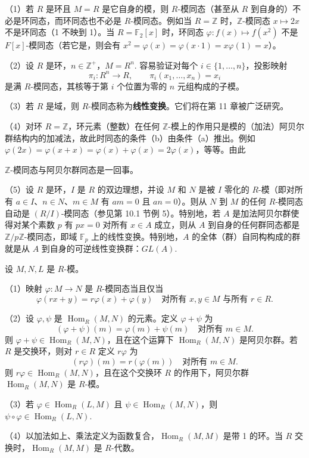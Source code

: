 \begin{example}
（1）若 \(R\) 是环且 \(M = R\) 是它自身的模，则 \(R\)-模同态（甚至从 \(R\) 到自身的）不必是环同态，而环同态也不必是 \(R\)-模同态。例如当 \(R = \mathbb{Z}\) 时，\(\mathbb{Z}\)-模同态 \(x \mapsto 2x\) 不是环同态（1 不映到 1）。当 \(R = \mathbb{F}_2[x]\) 时，环同态 \(\varphi : f(x) \mapsto f(x^2)\) 不是 \(F[x]\)-模同态（若它是，则会有 \(x^2 = \varphi(x) = \varphi(x \cdot 1) = x\varphi(1) = x\)）。

（2）设 \(R\) 是环，\(n \in \mathbb{Z}^+\)，\(M = R^n\). 容易验证对每个 \(i \in \{1, \ldots, n\}\)，投影映射
\[
\pi_i : R^n \to R, \qquad \pi_i(x_1, \ldots, x_n) = x_i
\]
是满 \(R\)-模同态，其核等于第 \(i\) 个位置为零的 \(n\) 元组构成的子模。

（3）若 \(R\) 是域，则 \(R\)-模同态称为\textbf{线性变换}。它们将在第 11 章被广泛研究。

（4）对环 \(R = \mathbb{Z}\)，环元素（整数）在任何 \(\mathbb{Z}\)-模上的作用只是模的（加法）阿贝尔群结构内的加减法，故此时同态的条件（b）由条件（a）推出。例如 \(\varphi(2x) = \varphi(x+x) = \varphi(x)+\varphi(x) = 2\varphi(x)\)，等等。由此

\begin{center}
\(\mathbb{Z}\)-模同态与阿贝尔群同态是一回事。
\end{center}

（5）设 \(R\) 是环，\(I\) 是 \(R\) 的双边理想，并设 \(M\) 和 \(N\) 是被 \(I\) 零化的 \(R\)-模（即对所有 \(a \in I\)、\(n \in N\)、\(m \in M\) 有 \(am = 0\) 且 \(an = 0\)）。则从 \(N\) 到 \(M\) 的任何 \(R\)-模同态自动是 \((R/I)\)-模同态（参见第 10.1 节例 5）。特别地，若 \(A\) 是加法阿贝尔群使得对某个素数 \(p\) 有 \(px = 0\) 对所有 \(x \in A\) 成立，则从 \(A\) 到自身的任何群同态都是 \(\mathbb{Z}/p\mathbb{Z}\)-模同态，即域 \(\mathbb{F}_p\) 上的线性变换。特别地，\(A\) 的全体（群）自同构构成的群就是从 \(A\) 到自身的可逆线性变换群：\(GL(A)\).
\end{example}

\begin{proposition}\label{pro:10.2}
设 \(M, N, L\) 是 \(R\)-模。

（1）映射 \(\varphi : M \to N\) 是 \(R\)-模同态当且仅当
\[
\varphi(rx+y) = r\varphi(x)+\varphi(y) \quad \text{对所有 } x, y \in M \text{ 与所有 } r \in R.
\]

（2）设 \(\varphi, \psi\) 是 \(\operatorname{Hom}_R(M, N)\) 的元素。定义 \(\varphi+\psi\) 为
\[
(\varphi+\psi)(m) = \varphi(m)+\psi(m) \quad \text{对所有 } m \in M.
\]
则 \(\varphi+\psi \in \operatorname{Hom}_R(M, N)\)，且在这个运算下 \(\operatorname{Hom}_R(M, N)\) 是阿贝尔群。若 \(R\) 是交换环，则对 \(r \in R\) 定义 \(r\varphi\) 为
\[
(r\varphi)(m) = r(\varphi(m)) \quad \text{对所有 } m \in M.
\]
则 \(r\varphi \in \operatorname{Hom}_R(M, N)\)，且在这个交换环 \(R\) 的作用下，阿贝尔群 \(\operatorname{Hom}_R(M, N)\) 是 \(R\)-模。

（3）若 \(\varphi \in \operatorname{Hom}_R(L, M)\) 且 \(\psi \in \operatorname{Hom}_R(M, N)\)，则 \(\psi \circ \varphi \in \operatorname{Hom}_R(L, N)\).

（4）以加法如上、乘法定义为函数复合，\(\operatorname{Hom}_R(M, M)\) 是带 1 的环。当 \(R\) 交换时，\(\operatorname{Hom}_R(M, M)\) 是 \(R\)-代数。
\end{proposition}

